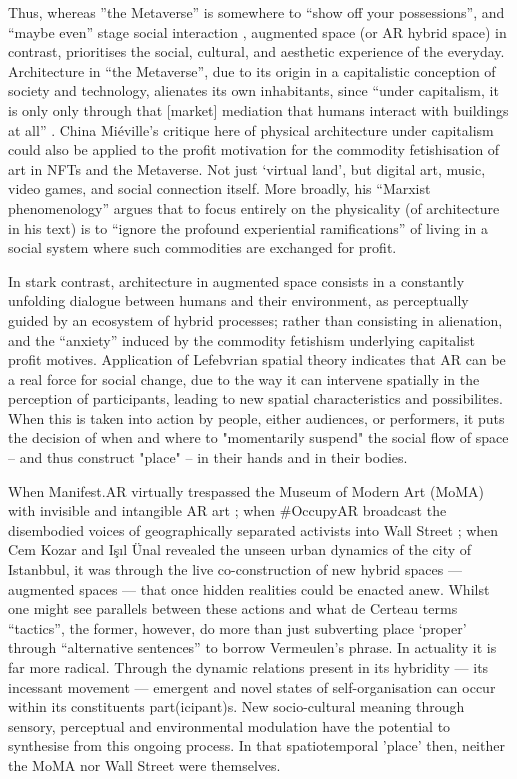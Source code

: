 Thus, whereas ”the Metaverse” is somewhere to “show off your possessions”, and “maybe even” stage social interaction \citep{marr2022}, augmented space (or AR hybrid space) in contrast, prioritises the social, cultural, and aesthetic experience of the everyday. Architecture in “the Metaverse”, due to its origin in a capitalistic conception of society and technology, alienates its own inhabitants, since “under capitalism, it is only only through that [market] mediation that humans interact with buildings at all” \citep[p. 18]{mieville1998}. China Miéville’s critique here of physical architecture under capitalism could also be applied to the profit motivation for the commodity fetishisation of art in NFTs and the Metaverse. Not just ‘virtual land’, but digital art, music, video games, and social connection itself. More broadly, his “Marxist phenomenology” argues that to focus entirely on the physicality (of architecture in his text) is to “ignore the profound experiential ramifications” of living in a social system where such commodities are exchanged for profit. 

In stark contrast, architecture in augmented space consists in a constantly unfolding dialogue between humans and their environment, as perceptually guided by an ecosystem of hybrid processes; rather than consisting in alienation, and the “anxiety” induced by the commodity fetishism underlying capitalist profit motives. Application of Lefebvrian spatial theory indicates that AR can be a real force for social change, due to the way it can intervene spatially in the perception of participants, leading to new spatial characteristics and possibilites. When this is taken into action by people, either audiences, or performers, it puts the decision of when and where to "momentarily suspend" the social flow of space -- and thus construct "place" -- in their hands and in their bodies.

When Manifest.AR virtually trespassed the Museum of Modern Art (MoMA) with invisible and intangible AR art \citep{veenhof2010}; when \#OccupyAR broadcast the disembodied voices of geographically separated activists into Wall Street \citep{skwarek2018}; when Cem Kozar and Işıl Ünal \citeyearpar{thiel2011,thiel2018} revealed the unseen urban dynamics of the city of Istanbbul, it was through the live co-construction of new hybrid spaces — augmented spaces — that once hidden realities could be enacted anew. Whilst one might see parallels between these actions and what de Certeau terms “tactics”, the former, however, do more than just subverting place ‘proper’ through “alternative sentences” to borrow Vermeulen’s phrase. In actuality it is far more radical. Through the dynamic relations present in its hybridity — its incessant movement — emergent and novel states of self-organisation can occur within its constituents part(icipant)s. New socio-cultural meaning through sensory, perceptual and environmental modulation have the potential to synthesise from this ongoing process. In that spatiotemporal 'place' then, neither the MoMA nor Wall Street were themselves.

